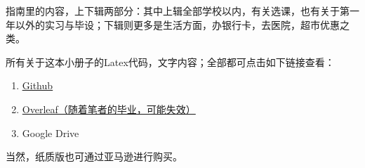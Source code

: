指南里的内容，上下辑两部分：其中上辑全部学校以内，有关选课，也有关于第一年以外的实习与毕设；下辑则更多是生活方面，办银行卡，去医院，超市优惠之类。

所有关于这本小册子的Latex代码，文字内容；全部都可点击如下链接查看：
\begin{enumerate}
\item \href{https://github.com/HochanWang/BMD-ZhiNan}{\uline{Github}}
\item \href{https://www.overleaf.com/9181971742xyhrjrdxdzkt}{Overleaf（随着笔者的毕业，可能失效）}
\item Google Drive
\end{enumerate}

当然，纸质版也可通过亚马逊进行购买。

